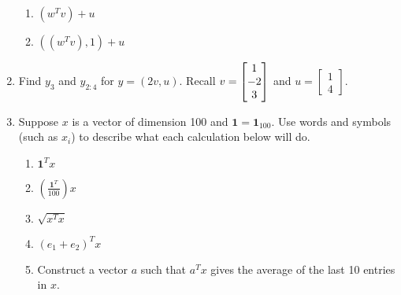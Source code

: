 \documentclass[11pt,fleqn]{article}
\newcommand{\bbm}{\begin{bmatrix}}
\newcommand{\ebm}{\end{bmatrix}}
\begin{document}
\begin{enumerate}
\begin{multicols}{2}
\begin{enumerate}
	
	\item $(w^Tv)+u$\\
\vspace{.5in}
	
	\item $((w^Tv),1)+u$\\
		\vspace{.5in}

	\end{enumerate}
	\end{multicols}
\vspace{.5in}



\newpage
\item Find $y_3$ and $y_{2:4}$ for $y=(2v,u).$ Recall $\displaystyle v=\begin{bmatrix} 1 \\ -2 \\ 3 \end{bmatrix}$ and  $u=\bbm 1\\4 \ebm.$ 
\vfill

\item Suppose $x$ is a vector of dimension 100 and $\textbf{1}=\textbf{1}_{100}$. Use words and symbols (such as $x_i$) to describe what each calculation below will do.
	\begin{enumerate}
	\item $\textbf{1}^Tx$\\
	\vfill
	\item $\left(\frac{\textbf{1}^T}{100}\right) x$
	\vfill
	\item $\sqrt{x^Tx}$
	\vfill
	\item $\left(e_1+e_2 \right)^Tx$
	\vfill
	\item Construct a vector $a$ such that $a^Tx$ gives the average of the last 10 entries in $x$.
	\vfill
	\end{enumerate}
\end{enumerate}
\end{document}
